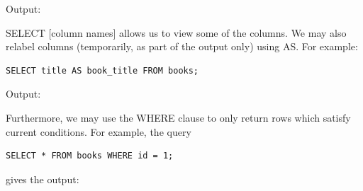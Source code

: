 \documentclass[8pt]{extarticle}
\begin{document}
\begin{multicols}{4}
Output:

\vspace{1.5ex}
\vspace*{1.5ex}

SELECT [column names] allows us to view some of the columns. We may also relabel columns (temporarily, as part of the output only) using AS. For example: 

\vspace{0.5ex}
\begin{lstlisting}[style=sql]
SELECT title AS book_title FROM books;
\end{lstlisting}
\vspace{0.5ex}

Output:
\begin{center}
\end{center} 
\vspace*{1.5ex}

Furthermore, we may use the WHERE clause to only return rows which satisfy current conditions. For example, the query

\vspace{0.5ex}
\begin{lstlisting}[style=sql]
SELECT * FROM books WHERE id = 1;
\end{lstlisting}
\vspace{0.5ex}

gives the output:


\vspace{1.5ex}
\vspace*{1.5ex}


\end{multicols}
\end{document}
